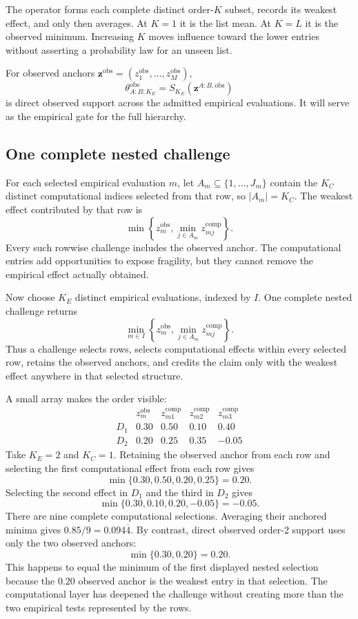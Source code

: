 \documentclass[11pt]{article}
\theoremstyle{remark}
\begin{document}
The operator forms each complete distinct order-$K$ subset, records its weakest
effect, and only then averages. At $K=1$ it is the list mean. At $K=L$ it is
the observed minimum. Increasing $K$ moves influence toward the lower entries
without asserting a probability law for an unseen list.

For observed anchors
$\mathbf z^{\mathrm{obs}}=(z_1^{\mathrm{obs}},\ldots,z_M^{\mathrm{obs}})$,
\begin{equation}
\theta^{\mathrm{obs}}_{A:B;K_E}
=
S_{K_E}(\mathbf z^{A:B,\mathrm{obs}})
\label{eq:observed-support}
\end{equation}
is direct observed support across the admitted empirical evaluations.
It will serve as the empirical gate for the full hierarchy.

\subsection{One complete nested challenge}

For each selected empirical evaluation $m$, let
$A_m\subseteq\{1,\ldots,J_m\}$ contain the $K_C$ distinct computational
indices selected from that row, so $|A_m|=K_C$. The weakest effect contributed
by that row is
\[
\min\left\{
z_m^{\mathrm{obs}},
\min_{j\in A_m}z_{mj}^{\mathrm{comp}}
\right\}.
\]
Every such rowwise challenge includes the observed anchor. The computational
entries add opportunities to expose fragility, but they cannot remove the
empirical effect actually obtained.

Now choose $K_E$ distinct empirical evaluations, indexed by $I$. One complete
nested challenge returns
\[
\min_{m\in I}
\left\{
z_m^{\mathrm{obs}},
\min_{j\in A_m}z_{mj}^{\mathrm{comp}}
\right\}.
\]
Thus a challenge selects rows, selects computational effects within every
selected row, retains the observed anchors, and credits the claim only with the
weakest effect anywhere in that selected structure.

A small array makes the order visible:
\[
\begin{array}{c|c|ccc}
&z_m^{\mathrm{obs}}&z_{m1}^{\mathrm{comp}}&z_{m2}^{\mathrm{comp}}&z_{m3}^{\mathrm{comp}}\\
\hline
D_1&0.30&0.50&0.10&0.40\\
D_2&0.20&0.25&0.35&-0.05
\end{array}
\]
Take $K_E=2$ and $K_C=1$. Retaining the observed anchor from each row and
selecting the first computational effect from each row gives
\[
\min\{0.30,0.50,0.20,0.25\}=0.20.
\]
Selecting the second effect in $D_1$ and the third in $D_2$ gives
\[
\min\{0.30,0.10,0.20,-0.05\}=-0.05.
\]
There are nine complete computational selections. Averaging their anchored
minima gives $0.85/9=0.094\overline4$. By contrast, direct observed order-2
support uses only the two observed anchors:
\[
\min\{0.30,0.20\}=0.20.
\]
This happens to equal the minimum of the first displayed nested selection
because the $0.20$ observed anchor is the weakest entry in that selection. The
computational layer has deepened the challenge without creating more than the
two empirical tests represented by the rows.
\end{document}
